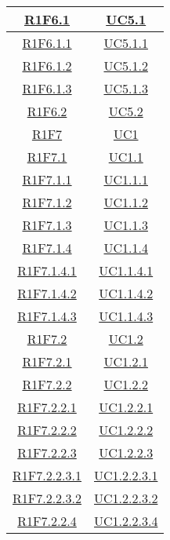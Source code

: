 \begin{longtable}{|c|c|}
\hline
\hyperlink{R1F6.1}{R1F6.1} & \hyperlink{UC5.1}{UC5.1}\\
\hline
\hyperlink{R1F6.1.1}{R1F6.1.1} & \hyperlink{UC5.1.1}{UC5.1.1}\\
\hline
\hyperlink{R1F6.1.2}{R1F6.1.2} & \hyperlink{UC5.1.2}{UC5.1.2}\\
\hline
\hyperlink{R1F6.1.3}{R1F6.1.3} & \hyperlink{UC5.1.3}{UC5.1.3}\\
\hline
\hyperlink{R1F6.2}{R1F6.2} & \hyperlink{UC5.2}{UC5.2}\\
\hline
\hyperlink{R1F7}{R1F7} & \hyperlink{UC1}{UC1}\\
\hline
\hyperlink{R1F7.1}{R1F7.1} & \hyperlink{UC1.1}{UC1.1}\\
\hline
\hyperlink{R1F7.1.1}{R1F7.1.1} & \hyperlink{UC1.1.1}{UC1.1.1}\\
\hline
\hyperlink{R1F7.1.2}{R1F7.1.2} & \hyperlink{UC1.1.2}{UC1.1.2}\\
\hline
\hyperlink{R1F7.1.3}{R1F7.1.3} & \hyperlink{UC1.1.3}{UC1.1.3}\\
\hline
\hyperlink{R1F7.1.4}{R1F7.1.4} & \hyperlink{UC1.1.4}{UC1.1.4}\\
\hline
\hyperlink{R1F7.1.4.1}{R1F7.1.4.1} & \hyperlink{UC1.1.4.1}{UC1.1.4.1}\\
\hline
\hyperlink{R1F7.1.4.2}{R1F7.1.4.2} & \hyperlink{UC1.1.4.2}{UC1.1.4.2}\\
\hline
\hyperlink{R1F7.1.4.3}{R1F7.1.4.3} & \hyperlink{UC1.1.4.3}{UC1.1.4.3}\\
\hline
\hyperlink{R1F7.2}{R1F7.2} & \hyperlink{UC1.2}{UC1.2}\\
\hline
\hyperlink{R1F7.2.1}{R1F7.2.1} & \hyperlink{UC1.2.1}{UC1.2.1}\\
\hline
\hyperlink{R1F7.2.2}{R1F7.2.2} & \hyperlink{UC1.2.2}{UC1.2.2}\\
\hline
\hyperlink{R1F7.2.2.1}{R1F7.2.2.1} & \hyperlink{UC1.2.2.1}{UC1.2.2.1}\\
\hline
\hyperlink{R1F7.2.2.2}{R1F7.2.2.2} & \hyperlink{UC1.2.2.2}{UC1.2.2.2}\\
\hline
\hyperlink{R1F7.2.2.3}{R1F7.2.2.3} & \hyperlink{UC1.2.2.3}{UC1.2.2.3}\\
\hline
\hyperlink{R1F7.2.2.3.1}{R1F7.2.2.3.1} & \hyperlink{UC1.2.2.3.1}{UC1.2.2.3.1}\\
\hline
\hyperlink{R1F7.2.2.3.2}{R1F7.2.2.3.2} & \hyperlink{UC1.2.2.3.2}{UC1.2.2.3.2}\\
\hline
\hyperlink{R1F7.2.2.4}{R1F7.2.2.4} & \hyperlink{UC1.2.2.4}{UC1.2.2.3.4}\\
\hline

\end{longtable}

